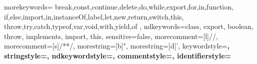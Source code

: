 \usepackage{textcomp}
\usepackage{xcolor}
\usepackage{listings}



 {
  morekeywords={
    break,const,continue,delete,do,while,export,for,in,function,
    if,else,import,in,instanceOf,label,let,new,return,switch,this,
    throw,try,catch,typeof,var,void,with,yield,of
  },
  ndkeywords={class, export, boolean, throw, implements, import, this},
  sensitive=false,
  morecomment=[l]{//},
  morecomment=[s]{/*}{*/},
  morestring=[b]",
  morestring=[d]',
  keywordstyle=\color{pink}\bfseries,
  stringstyle=\color{yellow}\ttfamily,
  ndkeywordstyle=\color{blue}\bfseries,
  commentstyle=\color{grey}\ttfamily,
  identifierstyle=\color{black}
}

\lstset{
  frame=tb,
  framesep=5pt,
  extendedchars=true,
  basicstyle=\footnotesize\ttfamily,
  showstringspaces=false,
  numbers=left,
  numberstyle=\footnotesize,
  numbersep=9pt,
  tabsize=2,
  breaklines=true,
  showtabs=false,
  captionpos=b,
  aboveskip=\bigskipamount,
  belowskip=\bigskipamount,
  xleftmargin=5pt,
  xrightmargin=5pt
}

\renewcommand\lstlistlistingname{List of Listings}

